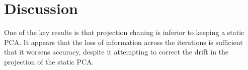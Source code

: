\section{Discussion}
One of the key results is that projection chaning is inferior to keeping a static PCA. It appears that the loss of information across the iterations is sufficient that it worsens accuracy, despite it attempting to correct the drift in the projection of the static PCA. 
